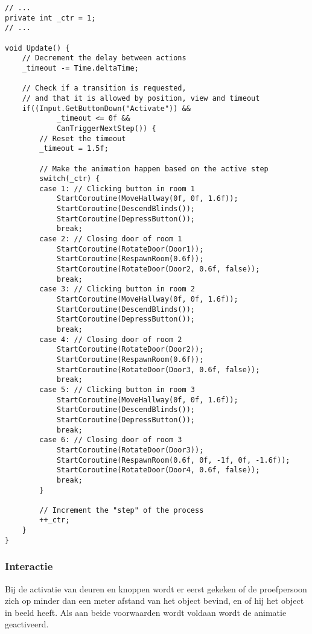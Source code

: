 \begin{verbatim}
// ...
private int _ctr = 1;
// ...

void Update() {
    // Decrement the delay between actions
    _timeout -= Time.deltaTime;

    // Check if a transition is requested, 
    // and that it is allowed by position, view and timeout
    if((Input.GetButtonDown("Activate")) && 
            _timeout <= 0f && 
            CanTriggerNextStep()) {
        // Reset the timeout
        _timeout = 1.5f;

        // Make the animation happen based on the active step
        switch(_ctr) {
        case 1: // Clicking button in room 1
            StartCoroutine(MoveHallway(0f, 0f, 1.6f));
            StartCoroutine(DescendBlinds());
            StartCoroutine(DepressButton());
            break;
        case 2: // Closing door of room 1
            StartCoroutine(RotateDoor(Door1));
            StartCoroutine(RespawnRoom(0.6f));
            StartCoroutine(RotateDoor(Door2, 0.6f, false));
            break;
        case 3: // Clicking button in room 2
            StartCoroutine(MoveHallway(0f, 0f, 1.6f));
            StartCoroutine(DescendBlinds());
            StartCoroutine(DepressButton());
            break;
        case 4: // Closing door of room 2
            StartCoroutine(RotateDoor(Door2));
            StartCoroutine(RespawnRoom(0.6f));
            StartCoroutine(RotateDoor(Door3, 0.6f, false));
            break;
        case 5: // Clicking button in room 3
            StartCoroutine(MoveHallway(0f, 0f, 1.6f));
            StartCoroutine(DescendBlinds());
            StartCoroutine(DepressButton());
            break;
        case 6: // Closing door of room 3
            StartCoroutine(RotateDoor(Door3));
            StartCoroutine(RespawnRoom(0.6f, 0f, -1f, 0f, -1.6f));
            StartCoroutine(RotateDoor(Door4, 0.6f, false));
            break;
        }

        // Increment the "step" of the process
        ++_ctr;
    }
}
\end{verbatim}


\subsubsection{Interactie}
Bij de activatie van deuren en knoppen wordt er eerst gekeken of de proefpersoon
zich op minder dan een meter afstand van het object bevind, en of hij het object
in beeld heeft. Als aan beide voorwaarden wordt voldaan wordt de animatie
geactiveerd.

